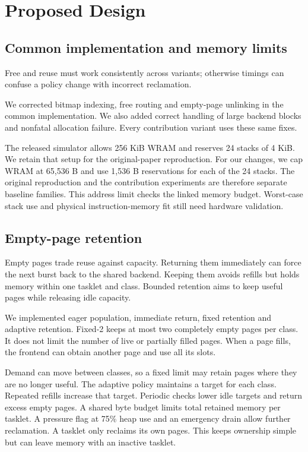 \documentclass[conference]{IEEEtran}
\begin{document}
\section{Proposed Design}
\subsection{Common implementation and memory limits}
Free and reuse must work consistently across variants; otherwise timings can confuse a policy change with incorrect reclamation.

We corrected bitmap indexing, free routing and empty-page unlinking in the common implementation. We also added correct handling of large backend blocks and nonfatal allocation failure. Every contribution variant uses these same fixes.

The released simulator allows 256 KiB WRAM and reserves 24 stacks of 4 KiB. We retain that setup for the original-paper reproduction. For our changes, we cap WRAM at 65,536 B and use 1,536 B reservations for each of the 24 stacks. The original reproduction and the contribution experiments are therefore separate baseline families. This address limit checks the linked memory budget. Worst-case stack use and physical instruction-memory fit still need hardware validation.

\subsection{Empty-page retention}
Empty pages trade reuse against capacity. Returning them immediately can force the next burst back to the shared backend. Keeping them avoids refills but holds memory within one tasklet and class. Bounded retention aims to keep useful pages while releasing idle capacity.

We implemented eager population, immediate return, fixed retention and adaptive retention. Fixed-2 keeps at most two completely empty pages per class. It does not limit the number of live or partially filled pages. When a page fills, the frontend can obtain another page and use all its slots.

Demand can move between classes, so a fixed limit may retain pages where they are no longer useful. The adaptive policy maintains a target for each class. Repeated refills increase that target. Periodic checks lower idle targets and return excess empty pages. A shared byte budget limits total retained memory per tasklet. A pressure flag at 75\% heap use and an emergency drain allow further reclamation. A tasklet only reclaims its own pages. This keeps ownership simple but can leave memory with an inactive tasklet.
\end{document}
